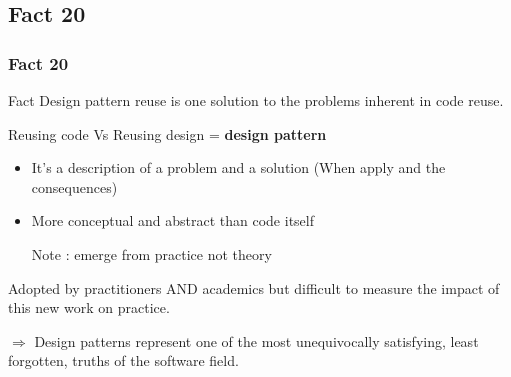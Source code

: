 \documentclass{beamer}
\begin{document}
\subsection{Fact 20}
\begin{frame}
    \frametitle{Fact 20}
    \begin{block}{Fact}
    Design pattern reuse is one solution to the problems inherent in code reuse.
    \end{block}

    Reusing code Vs Reusing design = \textbf{design pattern}

    \begin{itemize}
        \item It's a description of a problem and a solution
            (When apply and the consequences)
        \item More conceptual and abstract than code itself

        \item[Note]: emerge from practice not theory
    \end{itemize}

    Adopted by practitioners AND academics but difficult to measure the
    impact of this new work on practice.

    $\Rightarrow$  Design patterns represent one of the most unequivocally satisfying,
    least forgotten, truths of the software field.

\end{frame}
\end{document}
